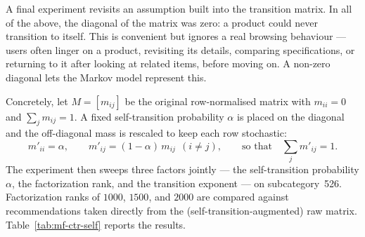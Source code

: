 A final experiment revisits an assumption built into the transition matrix. In
all of the above, the diagonal of the matrix was zero: a product could never
transition to itself. This is convenient but ignores a real browsing behaviour
--- users often linger on a product, revisiting its details, comparing
specifications, or returning to it after looking at related items, before moving
on. A non-zero diagonal lets the Markov model represent this.

Concretely, let $M=[m_{ij}]$ be the original row-normalised matrix with
$m_{ii}=0$ and $\sum_j m_{ij}=1$. A fixed self-transition probability $\alpha$ is
placed on the diagonal and the off-diagonal mass is rescaled to keep each row
stochastic:
\begin{equation}
  \label{eq:self-transition}
  m'_{ii} = \alpha,
  \qquad
  m'_{ij} = (1-\alpha)\,m_{ij}\ \ (i\neq j),
  \qquad\text{so that}\quad \sum_{j} m'_{ij} = 1 .
\end{equation}
The experiment then sweeps three factors jointly --- the self-transition
probability $\alpha$, the factorization rank, and the transition exponent --- on
subcategory~526. Factorization ranks of $1000$, $1500$, and $2000$ are compared
against recommendations taken directly from the (self-transition-augmented) raw
matrix. Table~\ref{tab:mf-ctr-self} reports the results.

